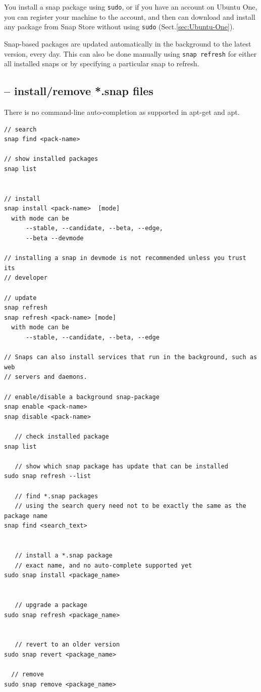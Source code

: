 You install a snap package using \verb!sudo!, or if you have an account on
Ubuntu One, you can register your machine to the account, and then can download
and install any package from Snap Store without using \verb!sudo!
(Sect.\ref{sec:Ubuntu-One}). 

Snap-based packages are updated automatically in the background to the latest
version, every day. This can also be done manually using \verb!snap refresh! for
either all installed snaps or by specifying a particular snap to refresh.

\subsection{-- install/remove *.snap files}

There is no command-line auto-completion as supported in apt-get and apt.

\begin{verbatim}
// search
snap find <pack-name>

// show installed packages
snap list


// install
snap install <pack-name>  [mode]
  with mode can be
      --stable, --candidate, --beta, --edge, 
      --beta --devmode

// installing a snap in devmode is not recommended unless you trust its
// developer

// update 
snap refresh
snap refresh <pack-name> [mode]
  with mode can be
      --stable, --candidate, --beta, --edge 

// Snaps can also install services that run in the background, such as web
// servers and daemons. 

// enable/disable a background snap-package
snap enable <pack-name>
snap disable <pack-name>

   // check installed package
snap list
   
   // show which snap package has update that can be installed
sudo snap refresh --list   

   // find *.snap packages
   // using the search query need not to be exactly the same as the package name
snap find <search_text>


   // install a *.snap package
   // exact name, and no auto-complete supported yet
sudo snap install <package_name> 

  
   // upgrade a package
sudo snap refresh <package_name>


   // revert to an older version
sudo snap revert <package_name>

  // remove
sudo snap remove <package_name>     
\end{verbatim}


